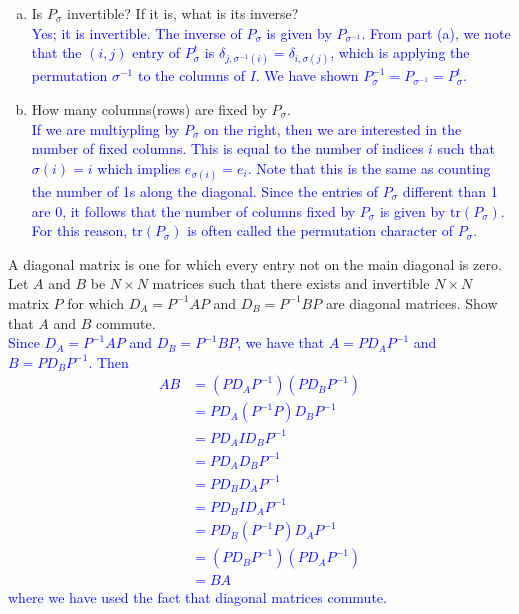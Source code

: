 \documentclass[a4paper,11pt]{article}
\newcommand{\BB}[1]{\textcolor{blue}{#1}}
\begin{document}
\begin{enumerate}[(a)]
\item Is $P_\sigma$ invertible? If it is, what is its inverse? \\

  \BB{Yes; it is invertible. The inverse of $P_\sigma$ is given by
    $P_{\sigma^{-1}}$. From part (a), we note that the $(i,j)$ entry of
    $P_{\sigma}^t$ is $\delta_{j,\sigma^{-1}(i)}=\delta_{i,\sigma(j)}$, which is
  applying the permutation $\sigma^{-1}$ to the columns of $I$. We have shown
  $P_\sigma^{-1}=P_{\sigma^{-1}}=P_\sigma^t$.\\}
  
\item How many columns(rows) are fixed by $P_\sigma$. \\

  \BB{If we are multiypling by $P_\sigma$ on the right, then we are interested
    in the number of fixed columns. This is equal to the number of indices $i$
    such that $\sigma(i)=i$ which implies $e_{\sigma(i)}=e_i$. Note that this is
  the same as counting the number of 1s along the diagonal. Since the entries of
$P_\sigma$ different than 1 are 0, it follows that the number of columns fixed
by $P_\sigma$ is given by $\text{tr}(P_\sigma)$. For this reason,
$\text{tr}(P_\sigma)$ is often called the permutation character of $P_\sigma$.\\}

\end{enumerate}

 A diagonal matrix is one for which every entry
not on the main diagonal is zero. Let $A$ and $B$ be $N \times N$ matrices such
that there exists and invertible $N \times N$ matrix $P$ for which
$D_A=P^{-1}AP$ and $D_B=P^{-1}BP$ are diagonal matrices. Show that $A$ and $B$
commute. \\

\BB{Since $D_A=P^{-1}AP$ and $D_B=P^{-1}BP$, we have that $A=PD_AP^{-1}$ and
  $B=PD_BP^{-1}$. Then
  \begin{align*}
    AB &= (PD_AP^{-1})(PD_BP^{-1}) \\
       &= PD_A(P^{-1}P)D_BP^{-1} \\
       &= PD_AID_BP^{-1} \\
       &= PD_AD_BP^{-1} \\
       &= PD_BD_AP^{-1} \\
       &= PD_BID_AP^{-1} \\
       &= PD_B(P^{-1}P)D_AP^{-1} \\
       &= (PD_BP^{-1})(PD_AP^{-1}) \\
       &= BA
  \end{align*}
  where we have used the fact that diagonal matrices commute.
}
\end{document}
